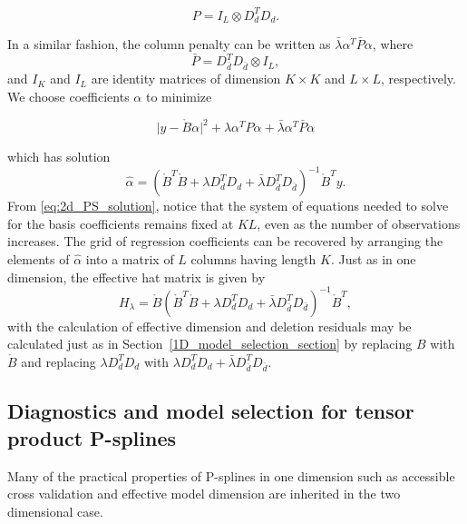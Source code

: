 \documentclass[12pt]{article}
\newcommand*\needsparaphrased{\color{red}}
\theoremstyle{definition}
\begin{document}
\[
P = I_L \otimes D_d^T D_d.
\]

In a similar fashion, the column penalty can be written as $\bar{\lambda} \alpha^T \bar{P} \alpha$, where
\[
\bar{P} = D_{\bar{d}}^T D_{\bar{d}} \otimes I_L, 
\]
and $I_K$ and $I_L$ are identity matrices of dimension  $K \times K$ and $L \times L$, respectively. We choose coefficients $\alpha$ to minimize

\begin{equation*}
\vert y - \mathring{B} \alpha \vert^2 + \lambda \alpha^T P \alpha + \bar{\lambda} \alpha^T \bar{P} \alpha
\end{equation*}

which has solution 
\begin{equation} \label{eq:2d_PS_solution}
\hat{\alpha} = \left(\mathring{B}^T \mathring{B} +  \lambda D_d^T D_d + \bar{\lambda} D_{\bar{d}}^T D_{\bar{d}} \right)^{-1} \mathring{B}^T y.
\end{equation}
\noindent
From \ref{eq:2d_PS_solution}, notice that the system of equations needed to solve for the basis coefficients remains fixed at $KL$, even as the number of observations increases. {\needsparaphrased{ [ introduce notation necessary for specifying the observed grid for both the $x$ and $v$ axes. ] }} The grid of regression coefficients can be recovered by arranging the elements of $\hat{\alpha}$ into a matrix of $L$ columns having length $K$. Just as in one dimension, the effective hat matrix is given by 
\[
H_\lambda = \mathring{B}\left(\mathring{B}^T \mathring{B} +  \lambda D_d^TD_d + \bar{\lambda} D_{\bar{d}}^T D_{\bar{d}} \right)^{-1} \mathring{B}^T,
\]
with the calculation of effective dimension and deletion residuals may be calculated just as in Section~\ref{1D_model_selection_section} by replacing $B$ with $\mathring{B}$ and replacing $\lambda D_d^T D_d$ with $\lambda D_d^TD_d + \bar{\lambda} D_{\bar{d}}^T D_{\bar{d}}$.

\subsection{ Diagnostics and model selection for tensor product P-splines }

Many of the practical properties of P-splines in one dimension such as accessible cross validation and effective model dimension are inherited in the two dimensional case. 

{\needsparaphrased{[ Discussion of effective model dimension, CV, and AIC should go here, along with figure with perspective plot showing a realistic 2d surface for various values of effective model dimension. ]}}
\end{document}
